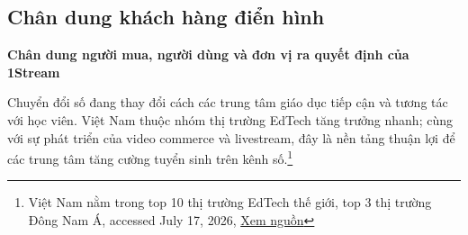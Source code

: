 %
%
%
%
%
%

\subsection{Chân dung khách hàng điển hình}

\textbf{Chân dung người mua, người dùng và đơn vị ra quyết định của 1Stream}

Chuyển đổi số đang thay đổi cách các trung tâm giáo dục tiếp cận và tương tác với học viên. Việt Nam thuộc nhóm thị trường EdTech tăng trưởng nhanh; cùng với sự phát triển của video commerce và livestream, đây là nền tảng thuận lợi để các trung tâm tăng cường tuyển sinh trên kênh số.\footnote{Việt Nam nằm trong top 10 thị trường EdTech thế giới, top 3 thị trường Đông Nam Á, accessed July 17, 2026, \href{https://vneconomy.vn/techconnect/viet-nam-nam-trong-top-10-thi-truong-edtech-the-gioi-top-3-thi-truong-dong-nam-a.htm}{Xem nguồn}}

